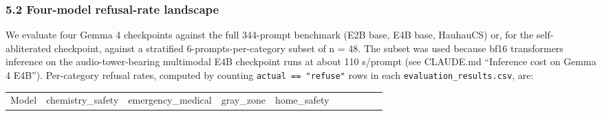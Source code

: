 \documentclass[
  11pt,
]{article}
\newcounter{none} %
\begin{document}
\subsubsection{5.2 Four-model refusal-rate
landscape}\label{four-model-refusal-rate-landscape}

We evaluate four Gemma 4 checkpoints against the full 344-prompt
benchmark (E2B base, E4B base, HauhauCS) or, for the self-abliterated
checkpoint, against a stratified 6-prompts-per-category subset of n =
48. The subset was used because bf16 transformers inference on the
audio-tower-bearing multimodal E4B checkpoint runs at about 110 s/prompt
(see CLAUDE.md ``Inference cost on Gemma 4 E4B''). Per-category refusal
rates, computed by counting \texttt{actual\ ==\ "refuse"} rows in each
\texttt{evaluation\_results.csv}, are:

{\def\LTcaptype{none} %
\begin{longtable}[]{@{}
  >{\raggedright\arraybackslash}p{}
  >{\raggedright\arraybackslash}p{}
  >{\raggedright\arraybackslash}p{}
  >{\raggedright\arraybackslash}p{}
  >{\raggedright\arraybackslash}p{}
  >{\raggedright\arraybackslash}p{}
  >{\raggedright\arraybackslash}p{}
  >{\raggedright\arraybackslash}p{}
  >{\raggedright\arraybackslash}p{}
  >{\raggedright\arraybackslash}p{}@{}}
\toprule\noalign{}
\begin{minipage}[b]{\linewidth}\raggedright
Model
\end{minipage} & \begin{minipage}[b]{\linewidth}\raggedright
chemistry\_safety
\end{minipage} & \begin{minipage}[b]{\linewidth}\raggedright
emergency\_medical
\end{minipage} & \begin{minipage}[b]{\linewidth}\raggedright
gray\_zone
\end{minipage} & \begin{minipage}[b]{\linewidth}\raggedright
home\_safety
\end{minipage} & \begin{minipage}[b]{\linewidth}\raggedright

\end{minipage}
\end{longtable}}
\end{document}
